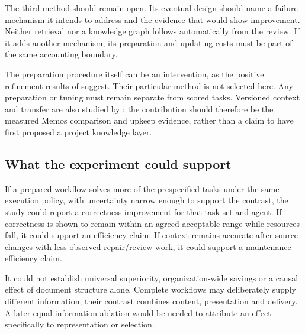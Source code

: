 The third method should remain open. Its eventual design should name a failure
mechanism it intends to address and the evidence that would show improvement.
Neither retrieval nor a knowledge graph follows automatically from the review.
If it adds another mechanism, its preparation and updating costs must be part
of the same accounting boundary.

The preparation procedure itself can be an intervention, as the positive
refinement results of \citet{shepard2026} suggest. Their particular method is
not selected here. Any preparation or tuning must remain separate from scored
tasks. Versioned context and transfer are also studied by \citet{kerbel2026};
the contribution should therefore be the measured Memos comparison and upkeep
evidence, rather than a claim to have first proposed a project knowledge layer.

\subsection{What the experiment could support}
If a prepared workflow solves more of the prespecified tasks under the same
execution policy, with uncertainty narrow enough to support the contrast, the
study could report a correctness improvement for that task set and agent.
If correctness is shown to remain within an agreed acceptable range while
resources fall, it could support an efficiency claim. If context remains
accurate after source changes with less observed repair/review work, it could
support a maintenance-efficiency claim.

It could not establish universal superiority, organization-wide savings or a
causal effect of document structure alone. Complete workflows may deliberately
supply different information; their contrast combines content, presentation
and delivery. A later equal-information ablation would be needed to attribute
an effect specifically to representation or selection.
